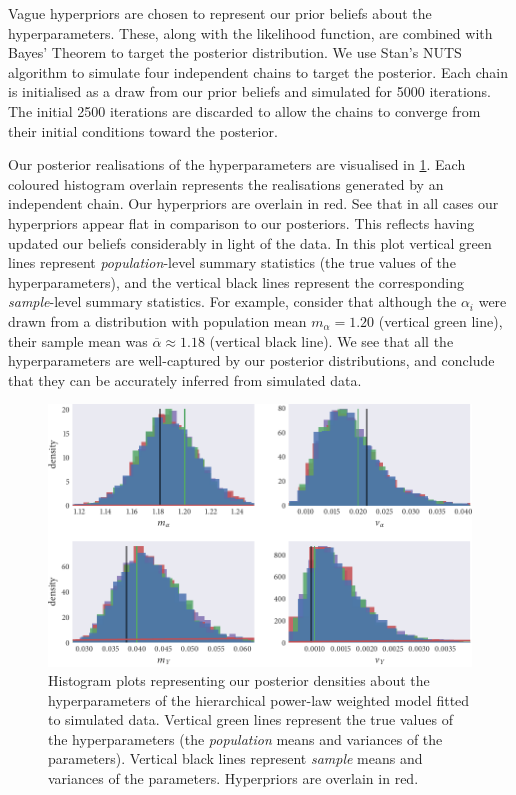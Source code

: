 Vague hyperpriors are chosen to represent our prior beliefs about the
hyperparameters. These, along with the likelihood function, are combined with
Bayes' Theorem to target the posterior distribution. We use Stan's NUTS
algorithm to simulate four independent chains to target the posterior. Each
chain is initialised as a draw from our prior beliefs and simulated for 5000
iterations. The initial 2500 iterations are discarded to allow the chains to
converge from their initial conditions toward the posterior.

Our posterior realisations of the hyperparameters are visualised in
\cref{fig:power_hier_hist}. Each coloured histogram overlain represents the
realisations generated by an independent chain. Our hyperpriors are overlain in
red. See that in all cases our hyperpriors appear flat in comparison to our
posteriors. This reflects having updated our beliefs considerably in light of
the data. In this plot vertical green lines represent \emph{population}-level
summary statistics (the true values of the hyperparameters), and the vertical
black lines represent the corresponding \emph{sample}-level summary statistics.
For example, consider that although the $\alpha_i$ were drawn from a
distribution with population mean $m_{\alpha}=1.20$ (vertical green line),
their sample mean was $\overline{\alpha}\approx1.18$ (vertical black line). We
see that all the hyperparameters are well-captured by our posterior
distributions, and conclude that they can be accurately inferred from simulated
data.

\begin{figure}[tbp]
  \includegraphics{power/power_hier_hist.pdf}
  \caption{Histogram plots representing our posterior densities about the
    hyperparameters of the hierarchical power-law weighted model fitted to
    simulated data. Vertical green lines represent the true values of the
    hyperparameters (the \emph{population} means and variances of the
    parameters). Vertical black lines represent \emph{sample} means and
    variances of the parameters. Hyperpriors are overlain in red.}
  \label{fig:power_hier_hist}
\end{figure}

